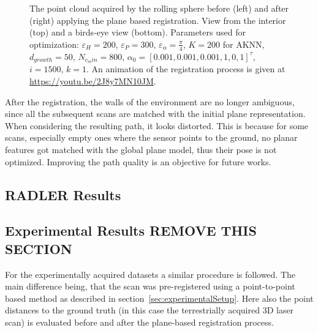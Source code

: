 \documentclass[5p]{elsarticle}
\renewcommand{\epsilon}{\varepsilon}
\begin{document}
\begin{figure}
        \caption{The point cloud acquired by the rolling sphere before (left) and after (right) applying the plane based registration. View from the interior (top) and a birds-eye view (bottom). Parameters used for optimization: $\epsilon_H = 200$, $\epsilon_P = 300$, $\epsilon_\alpha = \frac{\pi}{4}$, $K = 200$ for AKNN, $d_{growth} = 50$, $N_{c_min} = 800$, $\alpha_0 = [0.001, 0.001, 0.001, 1, 0, 1]^\tau$, $i = 1500$, $k = 1$. An animation of the registration process is given at \url{https://youtu.be/2J8y7MN10JM}.}
        \label{fig:jasperhome}
\end{figure}
After the registration, the walls of the environment are no longer ambiguous, since all the subsequent scans are matched with the initial plane representation.
When considering the resulting path, it looks distorted.
This is because for some scans, especially empty ones where the sensor points to the ground, no planar features got matched with the global plane model, thus their pose is not optimized.
Improving the path quality is an objective for future works.

\iffalse
	\subsection{RADLER Results}

	\subsection{Experimental Results REMOVE THIS SECTION}

	For the experimentally acquired datasets a similar procedure is followed. 
	The main difference being, that the scan was pre-registered using a point-to-point based method as described in section~\ref{sec:experimentalSetup}. 
	Here also the point distances to the ground truth (in this case the terrestrially acquired 3D laser scan) is evaluated before and after the plane-based registration process. 
\end{document}
